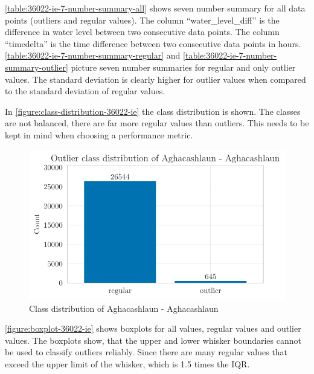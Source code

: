 \autoref{table:36022-ie-7-number-summary-all} shows seven number summary for all data points (outliers and regular values). The column ``water\_level\_diff'' is the difference in water level between two consecutive data points. The column ``timedelta'' is the time difference between two consecutive data points in hours. \autoref{table:36022-ie-7-number-summary-regular} and \autoref{table:36022-ie-7-number-summary-outlier} picture seven number summaries for regular and only outlier values. The standard deviation is clearly higher for outlier values when compared to the standard deviation of regular values.



\newline
In \autoref{figure:class-distribution-36022-ie} the class distribution is shown. The classes are not balanced, there are far more regular values than outliers. This needs to be kept in mind when choosing a performance metric.
\clearpage
\begin{figure}[htp]
    \centering
    \includegraphics{./plots/pdfs/36022-ie/outlier_class_distribution_36022-ie.pdf}
    \caption{Class distribution of Aghacashlaun - Aghacashlaun}
    \label{figure:class-distribution-36022-ie}
\end{figure}
\autoref{figure:boxplot-36022-ie} shows boxplots for all values, regular values and outlier values. The boxplots show, that the upper and lower whisker boundaries cannot be used to classify outliers reliably. Since there are many regular values that exceed the upper limit of the whisker, which is 1.5 times the \ac{IQR}.
